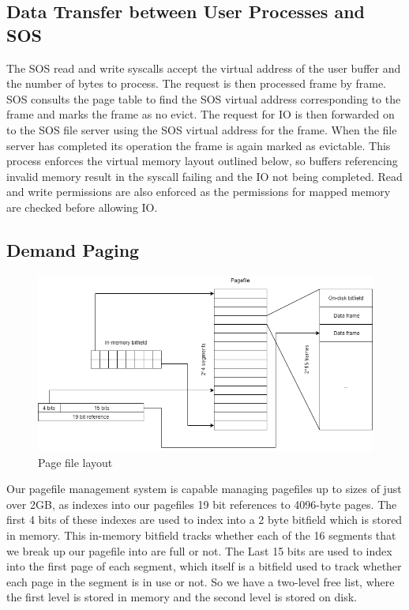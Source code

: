 \subsection{Data Transfer between User Processes and SOS}

\noindent
The SOS read and write syscalls accept the virtual address of the user
buffer and the number of bytes to process. The request is then processed
frame by frame. SOS consults the page table to find the SOS virtual
address corresponding to the frame and marks the frame as no evict.
The request for IO is then forwarded on to the SOS file server using the
SOS virtual address for the frame. When the file server 
has completed its operation the frame is again marked as evictable.
This process enforces the virtual memory layout outlined below, so
buffers referencing invalid memory result in the syscall failing and
the IO not being completed. Read and write permissions are also enforced
as the permissions for mapped memory are checked before allowing IO. 
\\


\subsection{Demand Paging}

\begin{figure}[h]
    \includegraphics[width=\linewidth]{pagefile.png}
    \caption{Page file layout}
    \label{fig:page_file}
\end{figure}

\noindent
Our pagefile management system is capable managing pagefiles
up to sizes of just over 2GB, as indexes into our pagefiles
19 bit references to 4096-byte pages. The first 4 bits of
these indexes are used to index into a 2 byte bitfield which
is stored in memory. This in-memory bitfield tracks whether 
each of the 16 segments that we break up our pagefile into 
are full or not. The Last 15 bits are used to index into 
the first page of each segment, which itself is a bitfield
used to track whether each page in the segment is in use
or not. So we have a two-level free list, where the first
level is stored in memory and the second level is stored
on disk.
\\


